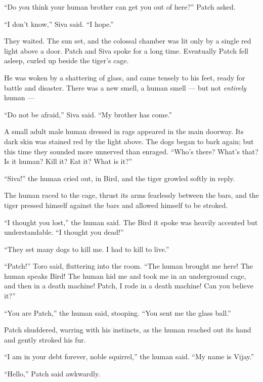 \documentclass[ebook,oneside,openany,17pt]{memoir}
\newenvironment{tolerant}[1]{%
  \par\tolerance=#1\relax
}{%
  \par
}
\begin{document}
“Do you think your human brother can get you out of here?” Patch
asked.

“I don’t know,” Siva said. “I hope.”

They waited. The sun set, and the colossal chamber was lit only by a
single red light above a door. Patch and Siva spoke for a long
time. Eventually Patch fell asleep, curled up beside the tiger’s cage.

\begin{tolerant}{1000}
He was woken by a shattering of glass, and came tensely to his feet,
ready for battle and disaster. There was a new smell, a human smell —
but not \emph{entirely} human —
\end{tolerant}

“Do not be afraid,” Siva said. “My brother has come.”

\begin{tolerant}{1000}
A small adult male human dressed in rags appeared in the main
doorway. Its dark skin was stain\-ed red by the light above. The dogs
began to bark again; but this time they sounded more unnerved than
enraged. “Who’s there? What’s that? Is it human? Kill it? Eat it?
What is it?”
\end{tolerant}

“Siva!” the human cried out, in Bird, and the tiger growled softly in
reply.

The human raced to the cage, thrust its arms fearlessly between the
bars, and the tiger pressed himself against the bars and allowed
himself to be stroked.

“I thought you lost,” the human said. The Bird it spoke was heavily
accented but understandable. “I thought you dead!”

“They set many dogs to kill me. I had to kill to live.”

“Patch!” Toro said, fluttering into the room. “The human brought me
here! The human speaks Bird! The human hid me and took me in an
underground cage, and then in a death machine! Patch, I rode in a
death machine! Can you believe it?”

“You are Patch,” the human said, stooping. “You sent me the glass
ball.”

Patch shuddered, warring with his instincts, as the human reached out
its hand and gently stroked his fur.

“I am in your debt forever, noble squirrel,” the human said. “My name
is Vijay.”

“Hello,” Patch said awkwardly.
\end{document}
